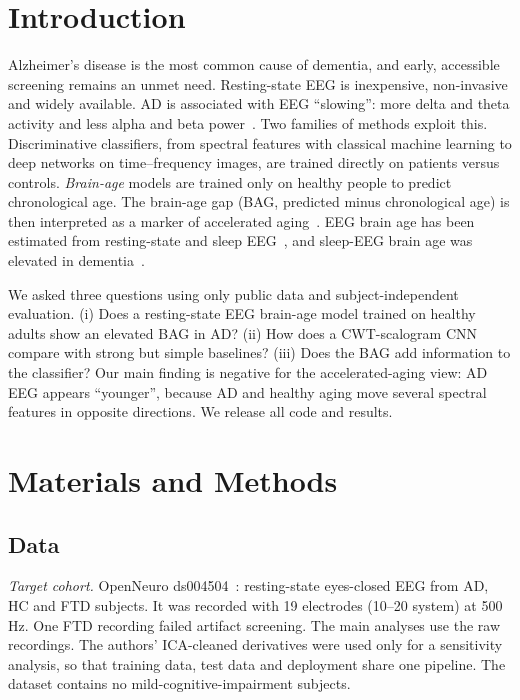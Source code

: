 \documentclass[conference]{IEEEtran}
\begin{document}
\section{Introduction}
Alzheimer's disease is the most common cause of dementia, and early, accessible screening remains an unmet need. Resting-state EEG is inexpensive, non-invasive and widely available. AD is associated with EEG ``slowing'': more delta and theta activity and less alpha and beta power~\cite{jeong2004,babiloni2020}. Two families of methods exploit this. Discriminative classifiers, from spectral features with classical machine learning to deep networks on time--frequency images, are trained directly on patients versus controls. \emph{Brain-age} models are trained only on healthy people to predict chronological age. The brain-age gap (BAG, predicted minus chronological age) is then interpreted as a marker of accelerated aging~\cite{cole2017,franke2019}. EEG brain age has been estimated from resting-state and sleep EEG~\cite{alzoubi2018,engemann2022}, and sleep-EEG brain age was elevated in dementia~\cite{sun2019}.

We asked three questions using only public data and subject-independent evaluation. (i) Does a resting-state EEG brain-age model trained on healthy adults show an elevated BAG in AD? (ii) How does a CWT-scalogram CNN compare with strong but simple baselines? (iii) Does the BAG add information to the classifier? Our main finding is negative for the accelerated-aging view: AD EEG appears ``younger'', because AD and healthy aging move several spectral features in opposite directions. We release all code and results.

\section{Materials and Methods}
\subsection{Data}
\emph{Target cohort.} OpenNeuro ds004504~\cite{miltiadous2023}: resting-state eyes-closed EEG from \nAD{} AD, \nHC{} HC and \nFTD{} FTD subjects. It was recorded with 19 electrodes (10--20 system) at 500\,Hz. One FTD recording failed artifact screening. The main analyses use the raw recordings. The authors' ICA-cleaned derivatives were used only for a sensitivity analysis, so that training data, test data and deployment share one pipeline. The dataset contains no mild-cognitive-impairment subjects.
\end{document}
